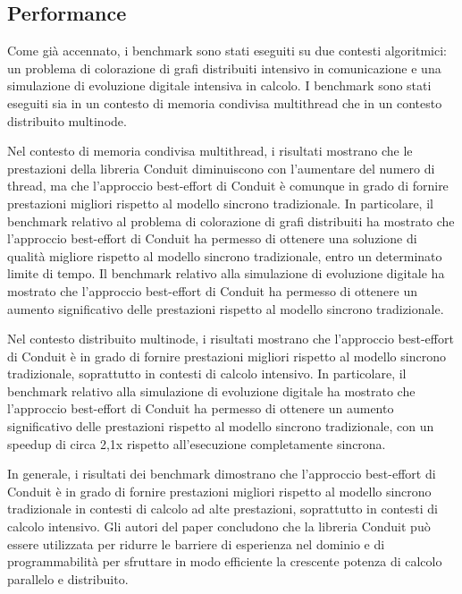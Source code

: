 \documentclass[11pt]{article}
\begin{document}
\begin{multicols*}{2}[\columnsep=1cm]
\subsection{Performance}
Come già accennato, i benchmark sono stati eseguiti su due contesti algoritmici: un problema di colorazione di grafi distribuiti intensivo in comunicazione e una simulazione di evoluzione digitale intensiva in calcolo. I benchmark sono stati eseguiti sia in un contesto di memoria condivisa multithread che in un contesto distribuito multinode.

Nel contesto di memoria condivisa multithread, i risultati mostrano che le prestazioni della libreria Conduit diminuiscono con l'aumentare del numero di thread, ma che l'approccio best-effort di Conduit è comunque in grado di fornire prestazioni migliori rispetto al modello sincrono tradizionale. In particolare, il benchmark relativo al problema di colorazione di grafi distribuiti ha mostrato che l'approccio best-effort di Conduit ha permesso di ottenere una soluzione di qualità migliore rispetto al modello sincrono tradizionale, entro un determinato limite di tempo. Il benchmark relativo alla simulazione di evoluzione digitale ha mostrato che l'approccio best-effort di Conduit ha permesso di ottenere un aumento significativo delle prestazioni rispetto al modello sincrono tradizionale.

Nel contesto distribuito multinode, i risultati mostrano che l'approccio best-effort di Conduit è in grado di fornire prestazioni migliori rispetto al modello sincrono tradizionale, soprattutto in contesti di calcolo intensivo. In particolare, il benchmark relativo alla simulazione di evoluzione digitale ha mostrato che l'approccio best-effort di Conduit ha permesso di ottenere un aumento significativo delle prestazioni rispetto al modello sincrono tradizionale, con un speedup di circa 2,1x rispetto all'esecuzione completamente sincrona.

In generale, i risultati dei benchmark dimostrano che l'approccio best-effort di Conduit è in grado di fornire prestazioni migliori rispetto al modello sincrono tradizionale in contesti di calcolo ad alte prestazioni, soprattutto in contesti di calcolo intensivo. Gli autori del paper concludono che la libreria Conduit può essere utilizzata per ridurre le barriere di esperienza nel dominio e di programmabilità per sfruttare in modo efficiente la crescente potenza di calcolo parallelo e distribuito.


\end{multicols*}
\end{document}
